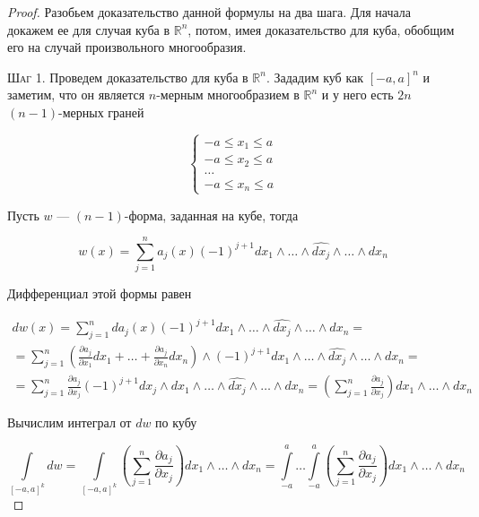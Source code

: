 \documentclass[a5paper]{article}
\theoremstyle{plain}
\theoremstyle{definition}
\numberwithin{through}{section}
\numberwithin{equation}{section}
\begin{document}
\begin{proof} Разобьем доказательство данной формулы на два шага. Для начала докажем ее для случая куба в
	$\mathbb{R}^n$, потом, имея доказательство для куба, обобщим его на случай произвольного многообразия.
	
	\textsc{Шаг 1.} Проведем доказательство для куба в $\mathbb{R}^n$. Зададим куб как $[-a, a]^n$ и заметим, что он является $n$-мерным многообразием в $\mathbb{R}^n$ и у него есть $2n$ $(n-1)$-мерных граней
	
	\begin{equation*}
	\begin{cases}
	-a \leq x_1 \leq a \\
	-a \leq x_2 \leq a \\
	\ldots \\
	-a \leq x_n \leq a
	\end{cases}
	\end{equation*}
	
	Пусть $w$ --- $(n-1)$-форма, заданная на кубе, тогда
	
	\begin{equation*}
	w(x) = \sum\limits_{j = 1}^{n} a_j(x) (-1)^{j+1} dx_1 \wedge \ldots \wedge \widehat{dx_j} \wedge \ldots \wedge dx_n
	\end{equation*}
	
	Дифференциал этой формы равен
	
	\begin{align*}
	dw(x) = \sum\limits_{j=1}^{n} da_j(x) (-1)^{j + 1} dx_1 \wedge \ldots \wedge \widehat{dx_j} \wedge \ldots \wedge dx_n = \\ =\sum\limits_{j=1}^{n} \left(\frac{\partial a_j}{\partial x_1} dx_1 + \ldots + \frac{\partial a_j}{\partial x_n} dx_n\right) \wedge (-1)^{j+1} dx_1 \wedge \ldots \wedge \widehat{dx_j} \wedge \ldots \wedge dx_n = \\ = \sum\limits_{j=1}^{n} \frac{\partial a_j}{\partial x_j} (-1)^{j+1} dx_j \wedge dx_1 \wedge \ldots \wedge \widehat{dx_j} \wedge \ldots \wedge dx_n = (\sum\limits_{j = 1}^{n} \frac{\partial a_j}{\partial x_j}) dx_1 \wedge \ldots \wedge dx_n
	\end{align*} 
	
	Вычислим интеграл от $dw$ по кубу
	
	\begin{equation*}
	\int\limits_{[-a, a]^k} dw = \int\limits_{[-a, a]^k} \left(\sum\limits_{j = 1}^{n} \frac{\partial a_j}{\partial x_j}\right) dx_1 \wedge \ldots \wedge dx_n = \int\limits_{-a}^{a} \ldots \int\limits_{-a}^{a} \left(\sum\limits_{j = 1}^{n} \frac{\partial a_j}{\partial x_j}\right) dx_1 \wedge \ldots \wedge dx_n
	\end{equation*}
	

\end{proof}
\end{document}
